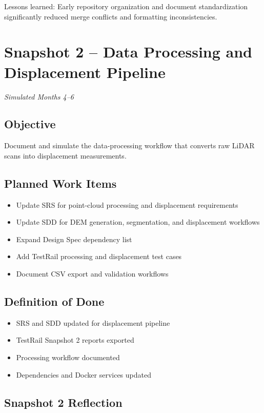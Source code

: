 \documentclass[11pt]{article}
\begin{document}
Lessons learned: Early repository organization and document standardization significantly reduced merge conflicts and formatting inconsistencies.

\section{Snapshot 2 -- Data Processing and Displacement Pipeline}

\textit{Simulated Months 4--6}

\subsection{Objective}

Document and simulate the data-processing workflow that converts raw LiDAR scans into displacement measurements.

\subsection{Planned Work Items}

\begin{itemize}[leftmargin=*]
  \item Update SRS for point-cloud processing and displacement requirements
  \item Update SDD for DEM generation, segmentation, and displacement workflows
  \item Expand Design Spec dependency list
  \item Add TestRail processing and displacement test cases
  \item Document CSV export and validation workflows
\end{itemize}

\subsection{Definition of Done}

\begin{itemize}[leftmargin=*]
  \item SRS and SDD updated for displacement pipeline
  \item TestRail Snapshot 2 reports exported
  \item Processing workflow documented
  \item Dependencies and Docker services updated
\end{itemize}

\subsection{Snapshot 2 Reflection}
\end{document}
